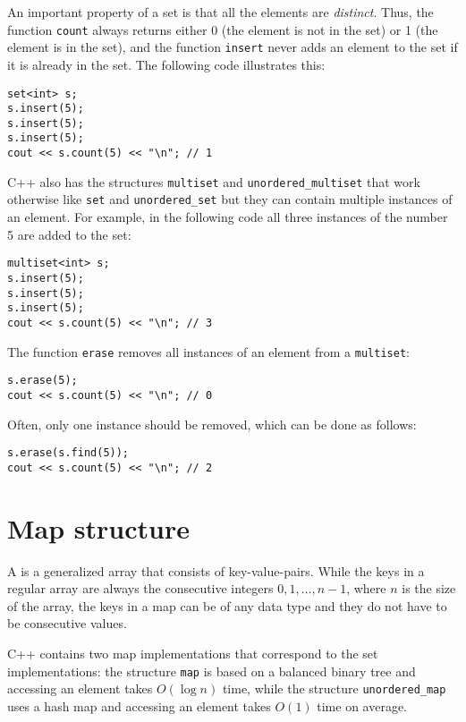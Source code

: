 An important property of a set is
that all the elements are \emph{distinct}.
Thus, the function \texttt{count} always returns
either 0 (the element is not in the set)
or 1 (the element is in the set),
and the function \texttt{insert} never adds
an element to the set if it is
already in the set.
The following code illustrates this:

\begin{lstlisting}
set<int> s;
s.insert(5);
s.insert(5);
s.insert(5);
cout << s.count(5) << "\n"; // 1
\end{lstlisting}

C++ also has the structures
\texttt{multiset} and \texttt{unordered\_multiset}
that work otherwise like \texttt{set}
and \texttt{unordered\_set}
but they can contain multiple instances of an element.
For example, in the following code all three instances
of the number 5 are added to the set:

\begin{lstlisting}
multiset<int> s;
s.insert(5);
s.insert(5);
s.insert(5);
cout << s.count(5) << "\n"; // 3
\end{lstlisting}
The function \texttt{erase} removes
all instances of an element
from a \texttt{multiset}:
\begin{lstlisting}
s.erase(5);
cout << s.count(5) << "\n"; // 0
\end{lstlisting}
Often, only one instance should be removed,
which can be done as follows:
\begin{lstlisting}
s.erase(s.find(5));
cout << s.count(5) << "\n"; // 2
\end{lstlisting}

\section{Map structure}


A  is a generalized array
that consists of key-value-pairs.
While the keys in a regular array are always
the consecutive integers $0,1,\ldots,n-1$,
where $n$ is the size of the array,
the keys in a map can be of any data type and
they do not have to be consecutive values.

C++ contains two map implementations that
correspond to the set implementations:
the structure
\texttt{map} is based on a balanced
binary tree and accessing an element
takes $O(\log n)$ time,
while the structure
\texttt{unordered\_map} uses a hash map
and accessing an element takes $O(1)$ time on average.

